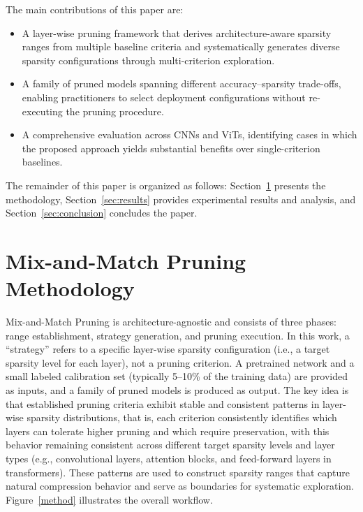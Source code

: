 \documentclass[11pt, conference]{IEEEtran}
\begin{document}
The main contributions of this paper are:
\begin{itemize}
    \item A layer-wise pruning framework that derives architecture-aware sparsity ranges from multiple baseline criteria and systematically generates diverse sparsity configurations through multi-criterion exploration.
    \item A family of pruned models spanning different accuracy--sparsity trade-offs, enabling practitioners to select deployment configurations without re-executing the pruning procedure.
    \item A comprehensive evaluation across CNNs and ViTs, identifying cases in which the proposed approach yields substantial benefits over single-criterion baselines.
\end{itemize}

The remainder of this paper is organized as follows: Section~\ref{sec:method} presents the methodology, Section~\ref{sec:results} provides experimental results and analysis, and Section~\ref{sec:conclusion} concludes the paper.

\FloatBarrier
\section{Mix-and-Match Pruning Methodology}
\label{sec:method}
Mix-and-Match Pruning is architecture-agnostic and consists of three phases: range establishment, strategy generation, and pruning execution. In this work, a ``strategy'' refers to a specific layer-wise sparsity configuration (i.e., a target sparsity level for each layer), not a pruning criterion. A pretrained network and a small labeled calibration set (typically 5--10\% of the training data) are provided as inputs, and a family of pruned models is produced as output. The key idea is that established pruning criteria exhibit stable and consistent patterns in layer-wise sparsity distributions, that is, each criterion consistently identifies which layers can tolerate higher pruning and which require preservation, with this behavior remaining consistent across different target sparsity levels and layer types (e.g., convolutional layers, attention blocks, and feed-forward layers in transformers). These patterns are used to construct sparsity ranges that capture natural compression behavior and serve as boundaries for systematic exploration. Figure~\ref{method} illustrates the overall workflow.

\end{document}
